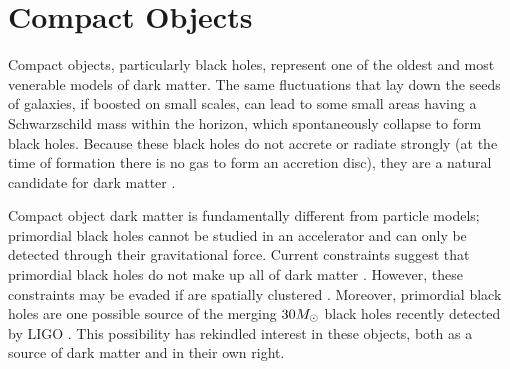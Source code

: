 \section{Compact Objects }
\label{sec:machos}

Compact objects, particularly black holes, represent one of the oldest and most venerable models of dark matter. 
The same fluctuations that lay down the seeds of galaxies, if boosted on small scales, can lead to some small areas having a Schwarzschild mass within the horizon, which spontaneously collapse to form black holes.  Because these black holes do not accrete or radiate strongly (at the time of formation there is no gas to form an accretion disc), they are a natural candidate for dark matter \citep{Carr:1974nx,Meszaros:1974,1975Natur.253..251C,Bellido:1996,2016PhRvD..94h3504C}. 

Compact object dark matter is fundamentally different from particle models; primordial black holes cannot be studied in an accelerator and can only be detected through their gravitational force. Current constraints suggest that primordial black holes do not make up all of dark matter \citep[\eg][]{Sasaki:2018}. However, these constraints may be evaded if  are spatially clustered \citep{Clesse:2015,Clesse:2017}. Moreover, primordial black holes are one possible source of the merging $30 M_\odot$ black holes recently detected by LIGO \citep{Bird:2016,Clesse:2016}. This possibility has rekindled interest in these objects, both as a source of dark matter and in their own right.

